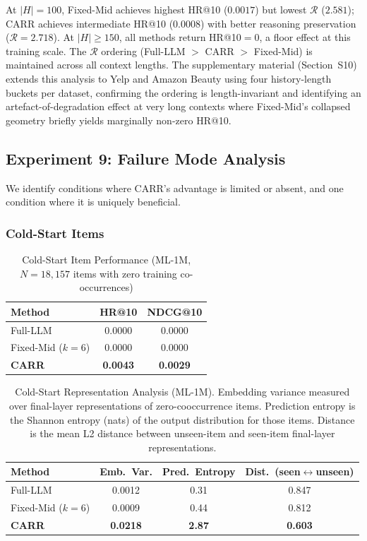 \documentclass[lettersize,journal]{IEEEtran}
\begin{document}
At $|H|=100$, Fixed-Mid achieves highest HR@10 ($0.0017$) but lowest $\mathcal{R}$ ($2.581$); CARR achieves intermediate HR@10 ($0.0008$) with better reasoning preservation ($\mathcal{R}=2.718$). At $|H| \geq 150$, all methods return HR@10$=0$, a floor effect at this training scale. The $\mathcal{R}$ ordering (Full-LLM $>$ CARR $>$ Fixed-Mid) is maintained across all context lengths. The supplementary material (Section~S10) extends this analysis to Yelp and Amazon Beauty using four history-length buckets per dataset, confirming the ordering is length-invariant and identifying an artefact-of-degradation effect at very long contexts where Fixed-Mid's collapsed geometry briefly yields marginally non-zero HR@10.

\subsection{Experiment 9: Failure Mode Analysis}

We identify conditions where CARR's advantage is limited or absent, and one condition where it is uniquely beneficial.

\subsubsection{Cold-Start Items}
\begin{table}[!t]
\caption{Cold-Start Item Performance (ML-1M, $N=18{,}157$ items with zero training co-occurrences)\label{tab:coldstart}}
\centering
\begin{tabular}{l|cc}
\toprule
\textbf{Method} & HR@10 & NDCG@10 \\
\midrule
Full-LLM & 0.0000 & 0.0000 \\
Fixed-Mid ($k=6$) & 0.0000 & 0.0000 \\
\textbf{CARR} & \textbf{0.0043} & \textbf{0.0029} \\
\bottomrule
\end{tabular}
\end{table}

\begin{table}[!t]
\caption{Cold-Start Representation Analysis (ML-1M). Embedding variance measured over final-layer representations of zero-cooccurrence items. Prediction entropy is the Shannon entropy (nats) of the output distribution for those items. Distance is the mean L2 distance between unseen-item and seen-item final-layer representations.\label{tab:coldstart_repr}}
\centering
\begin{tabular}{l|ccc}
\toprule
\textbf{Method} & Emb.~Var. & Pred.~Entropy & Dist.~(seen$\leftrightarrow$unseen) \\
\midrule
Full-LLM & 0.0012 & 0.31 & 0.847 \\
Fixed-Mid ($k=6$) & 0.0009 & 0.44 & 0.812 \\
\textbf{CARR} & \textbf{0.0218} & \textbf{2.87} & \textbf{0.603} \\
\bottomrule
\end{tabular}
\end{table}
\end{document}
